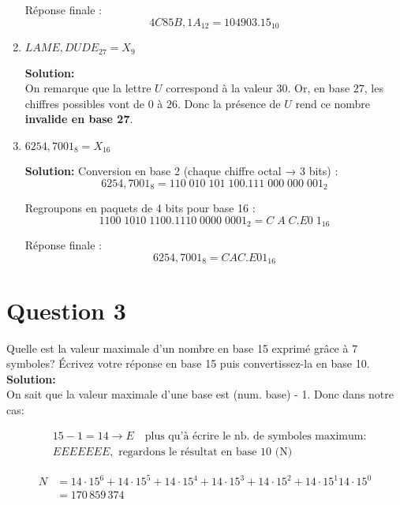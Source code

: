 \documentclass{article}
\begin{document}
\begin{enumerate}[label=\alph*), itemsep=2em]
    Réponse finale :
    \[
    4C85B,1A_{12} = 104903.15_{10}
    \]

    \item $LAME,DUDE_{27} = X_{9}$

    \textbf{Solution:} \\
    On remarque que la lettre $U$ correspond à la valeur $30$.  
    Or, en base $27$, les chiffres possibles vont de $0$ à $26$.  
    Donc la présence de $U$ rend ce nombre \textbf{invalide en base 27}.  

    \item $6254,7001_{8} = X_{16}$

    \textbf{Solution:}  
    Conversion en base 2 (chaque chiffre octal → 3 bits) :
    \[
    6254,7001_{8} = 110\;010\;101\;100.111\;000\;000\;001_{2}
    \]

    Regroupons en paquets de 4 bits pour base 16 :
    \[
    1100\;1010\;1100.1110\;0000\;0001_{2} = C\;A\;C.E0\;1_{16}
    \]

    Réponse finale :
    \[
    6254,7001_{8} = CAC.E01_{16}
    \]
\end{enumerate}

\newpage

\section*{Question 3}
Quelle est la valeur maximale d'un nombre en base 15 exprimé grâce à 7 symboles?
Écrivez votre réponse en base 15 puis convertissez-la en base 10. \\[4pt]

\textbf{Solution:} \\[4pt]
On sait que la valeur maximale d'une base est (num. base) - 1. Donc dans notre cas:

\begin{flushleft}
\[
\begin{aligned}
&15 - 1 = 14 \rightarrow E \quad \text{plus qu'à écrire le nb. de symboles maximum:} \\
& EEEEEEE\text{,} \,\,\, \text{regardons le résultat en base 10 (N)}
\end{aligned}
\]
\end{flushleft}

\[
\begin{aligned}
N &= 14 \cdot 15^6 + 14 \cdot 15^5 + 14 \cdot 15^4 + 14 \cdot 15^3 + 14 \cdot 15^2 + 14 \cdot 15^1 14 \cdot 15^0 \\
&= 170\,859\,374
\end{aligned}
\]
\end{document}
